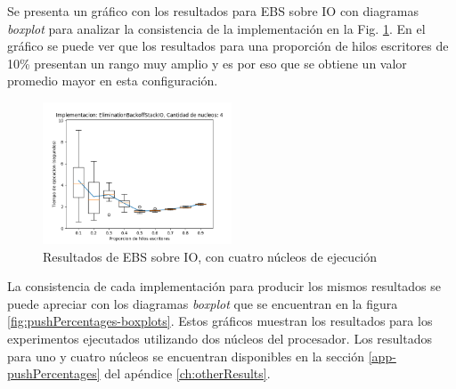 Se presenta un gráfico con los resultados para EBS sobre IO con diagramas \emph{boxplot} para analizar la consistencia de la implementación en la Fig. \ref{fig:pushPercentages-ebsio-4}.
En el gráfico se puede ver que los resultados para una proporción de hilos escritores de 10\% presentan un rango muy amplio y es por eso que se obtiene un valor promedio mayor en esta configuración.

\begin{figure}[!h]
    \centering
    \includegraphics[width=0.5\textwidth]{images/pushPercentages/plots/expEBSIO-4.png}
    \caption{Resultados de EBS sobre IO, con cuatro núcleos de ejecución}
    \label{fig:pushPercentages-ebsio-4}
\end{figure}

La consistencia de cada implementación para producir los mismos resultados se puede apreciar con los diagramas \emph{boxplot} que se encuentran en la figura \ref{fig:pushPercentages-boxplots}. Estos gráficos muestran los resultados para los experimentos ejecutados utilizando dos núcleos del procesador. Los resultados para uno y cuatro núcleos se encuentran disponibles en la sección \ref{app-pushPercentages} del apéndice \ref{ch:otherResults}.

